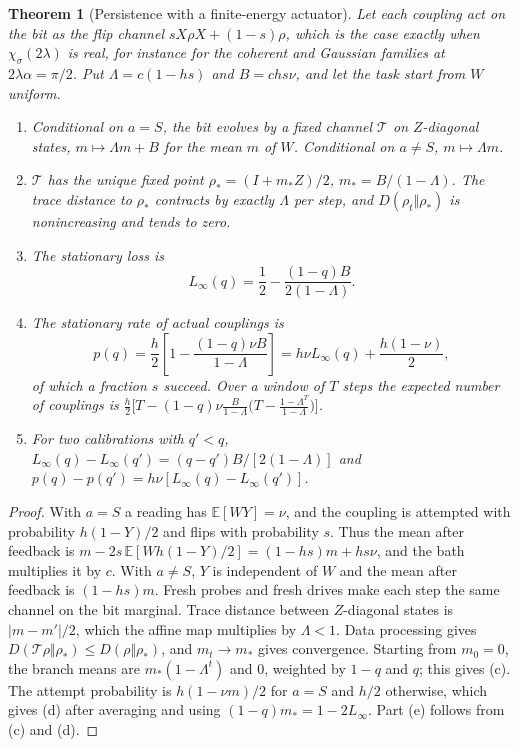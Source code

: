 \documentclass[aps,pre,onecolumn,superscriptaddress,floatfix,longbibliography]{revtex4-2}
\newtheorem{theorem}{Theorem}
\begin{document}
\begin{theorem}[Persistence with a finite-energy actuator]
\label{thm:persist}
Let each coupling act on the bit as the flip channel $sX\rho X+(1-s)\rho$, which is the case exactly when $\chi_\sigma(2\lambda)$ is real, for instance for the coherent and Gaussian families at $2\lambda\alpha=\pi/2$. Put $\Lambda=c(1-hs)$ and $B=chs\nu$, and let the task start from $W$ uniform.
\begin{enumerate}
\item[(a)] Conditional on $a=S$, the bit evolves by a fixed channel $\mathcal T$ on $Z$-diagonal states, $m\mapsto\Lambda m+B$ for the mean $m$ of $W$. Conditional on $a\ne S$, $m\mapsto\Lambda m$.
\item[(b)] $\mathcal T$ has the unique fixed point $\rho_*=(I+m_*Z)/2$, $m_*=B/(1-\Lambda)$. The trace distance to $\rho_*$ contracts by exactly $\Lambda$ per step, and $D(\rho_t\Vert\rho_*)$ is nonincreasing and tends to zero.
\item[(c)] The stationary loss is
\begin{equation}
L_\infty(q)=\frac12-\frac{(1-q)B}{2(1-\Lambda)}.
\label{eq:loss}
\end{equation}
\item[(d)] The stationary rate of actual couplings is
\begin{equation}
p(q)=\frac h2\left[1-\frac{(1-q)\nu B}{1-\Lambda}\right]=h\nu L_\infty(q)+\frac{h(1-\nu)}2,
\label{eq:rate}
\end{equation}
of which a fraction $s$ succeed. Over a window of $T$ steps the expected number of couplings is $\tfrac h2\bigl[T-(1-q)\nu\tfrac B{1-\Lambda}\bigl(T-\tfrac{1-\Lambda^T}{1-\Lambda}\bigr)\bigr]$.
\item[(e)] For two calibrations with $q'<q$, $L_\infty(q)-L_\infty(q')=(q-q')B/[2(1-\Lambda)]$ and $p(q)-p(q')=h\nu[L_\infty(q)-L_\infty(q')]$.
\end{enumerate}
\end{theorem}

\begin{proof}
With $a=S$ a reading has $\mathbb E[WY]=\nu$, and the coupling is attempted with probability $h(1-Y)/2$ and flips with probability $s$. Thus the mean after feedback is $m-2s\,\mathbb E[W h(1-Y)/2]=(1-hs)m+hs\nu$, and the bath multiplies it by $c$. With $a\ne S$, $Y$ is independent of $W$ and the mean after feedback is $(1-hs)m$. Fresh probes and fresh drives make each step the same channel on the bit marginal. Trace distance between $Z$-diagonal states is $|m-m'|/2$, which the affine map multiplies by $\Lambda<1$. Data processing gives $D(\mathcal T\rho\Vert\rho_*)\le D(\rho\Vert\rho_*)$, and $m_t\to m_*$ gives convergence. Starting from $m_0=0$, the branch means are $m_*(1-\Lambda^t)$ and $0$, weighted by $1-q$ and $q$; this gives (c). The attempt probability is $h(1-\nu m)/2$ for $a=S$ and $h/2$ otherwise, which gives (d) after averaging and using $(1-q)m_*=1-2L_\infty$. Part (e) follows from (c) and (d).
\end{proof}
\end{document}
